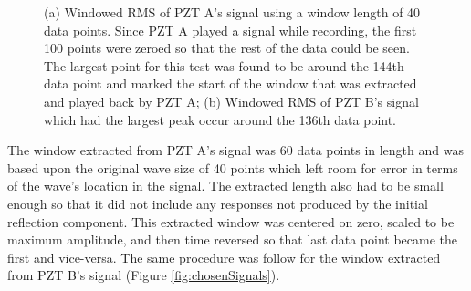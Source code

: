 \begin{figure}
\begin{subfigmatrix}{2}
\end{subfigmatrix}

  \caption[all]
  { \label{fig:windowedRMS}
(a) Windowed RMS of PZT A's signal using a window length of 40 data points. Since PZT A played a signal while recording, the first 100 points were zeroed so that the rest of the data could be seen. The largest point for this test was found to be around the 144th data point and marked the start of the window that was extracted and played back by PZT A;
(b) Windowed RMS of PZT B's signal which had the largest peak occur around the 136th data point.
}
\end{figure}

The window extracted from PZT A's signal was 60 data points in length and was based upon the original wave size of 40 points which left room for error in terms of the wave's location in the signal. The extracted length also had to be small enough so that it did not include any responses not produced by the initial reflection component. This extracted window was centered on zero, scaled to be maximum amplitude, and then time reversed so that last data point became the first and vice-versa. The same procedure was follow for the window extracted from PZT B's signal (Figure \ref{fig:chosenSignals}).

